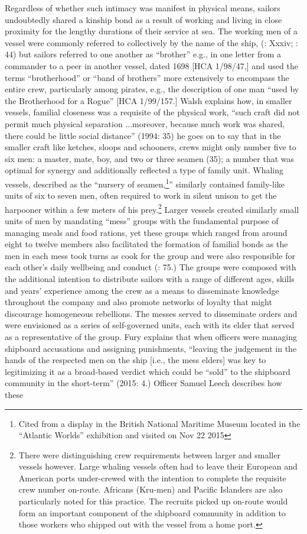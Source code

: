   Regardless of whether such intimacy was manifest in physical means, sailors undoubtedly shared a kinship bond as a result of working and living in close proximity for the lengthy durations of their service at sea. The working men of a vessel were commonly referred to collectively by the name of the ship, (\citealt{AdkinsAdkins2008}: Xxxiv; \citealt{Palmer1986}: 44) but sailors referred to one another as “brother” e.g., in one letter from a commander to a peer in another vessel, dated 1698 [HCA 1/98/47,] and used the terms “brotherhood” or “band of brothers” more extensively to encompass the entire crew, particularly among pirates, e.g., the description of one man “used by the Brotherhood for a Rogue” [HCA 1/99/157.] Walsh explains how, in smaller vessels, familial closeness was a requisite of the physical work, “such craft did not permit much physical separation ...moreover, because much work was shared, there could be little social distance” (1994: 35) he goes on to say that in the smaller craft like ketches, sloops and schooners, crews might only number five to six men: a master, mate, boy, and two or three seamen (35); a number that was optimal for synergy and additionally reflected a type of family unit. Whaling vessels, described as the “nursery of seamen,\footnote{Cited from a display in the British National Maritime Museum located in the “Atlantic Worlds” exhibition and visited on Nov 22 2015}” similarly contained family-like units of six to seven men, often required to work in silent unison to get the harpooner within a few meters of his prey.\footnote{There were distinguishing crew requirements between larger and smaller vessels however. Large whaling vessels often had to leave their European and American ports under-crewed with the intention to complete the requisite crew number on-route. Africans (Kru-men) and Pacific Islanders are also particularly noted for this practice. The recruits picked up on-route would form an important component of the shipboard community in addition to those workers who shipped out with the vessel from a home port.}  Larger vessels created similarly small units of men by mandating “mess” groups with the fundamental purpose of managing meals and food rations, yet these groups which ranged from around eight to twelve members also facilitated the formation of familial bonds as the men in each mess took turns as cook for the group and were also responsible for each other’s daily wellbeing and conduct (\citealt{AdkinsAdkins2008}: 75.) The groups were composed with the additional intention to distribute sailors with a range of different ages, skills and years’ experience among the crew as a means to disseminate knowledge throughout the company and also promote networks of loyalty that might discourage homogeneous rebellions. The messes served to disseminate orders and were envisioned as a series of self-governed units, each with its elder that served as a representative of the group. Fury explains that when officers were managing shipboard accusations and assigning punishments, “leaving the judgement in the hands of the respected men on the ship [i.e., the mess elders] was key to legitimizing it as a broad-based verdict which could be “sold” to the shipboard community in the short-term” (2015: 4.) Officer Samuel Leech describes how these 